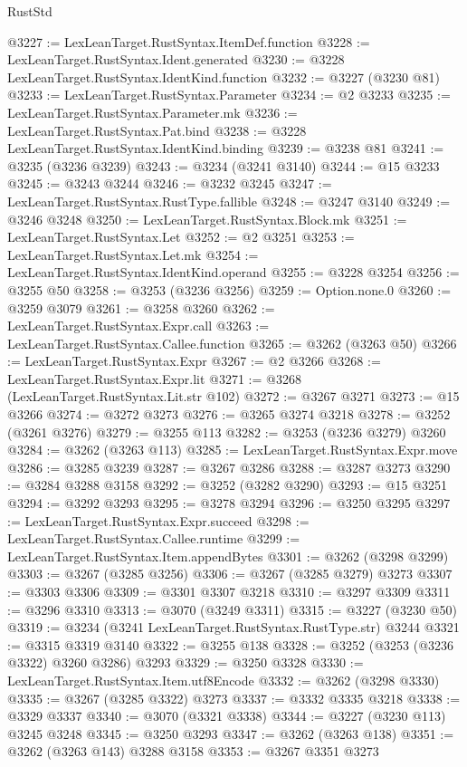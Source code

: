 \begin{lexlean}{RustStd}
\begin{coremodule}
@3227 := LexLeanTarget.RustSyntax.ItemDef.function
@3228 := LexLeanTarget.RustSyntax.Ident.generated
@3230 := @3228 LexLeanTarget.RustSyntax.IdentKind.function
@3232 := @3227 (@3230 @81)
@3233 := LexLeanTarget.RustSyntax.Parameter
@3234 := @2 @3233
@3235 := LexLeanTarget.RustSyntax.Parameter.mk
@3236 := LexLeanTarget.RustSyntax.Pat.bind
@3238 := @3228 LexLeanTarget.RustSyntax.IdentKind.binding
@3239 := @3238 @81
@3241 := @3235 (@3236 @3239)
@3243 := @3234 (@3241 @3140)
@3244 := @15 @3233
@3245 := @3243 @3244
@3246 := @3232 @3245
@3247 := LexLeanTarget.RustSyntax.RustType.fallible
@3248 := @3247 @3140
@3249 := @3246 @3248
@3250 := LexLeanTarget.RustSyntax.Block.mk
@3251 := LexLeanTarget.RustSyntax.Let
@3252 := @2 @3251
@3253 := LexLeanTarget.RustSyntax.Let.mk
@3254 := LexLeanTarget.RustSyntax.IdentKind.operand
@3255 := @3228 @3254
@3256 := @3255 @50
@3258 := @3253 (@3236 @3256)
@3259 := Option.none.{0}
@3260 := @3259 @3079
@3261 := @3258 @3260
@3262 := LexLeanTarget.RustSyntax.Expr.call
@3263 := LexLeanTarget.RustSyntax.Callee.function
@3265 := @3262 (@3263 @50)
@3266 := LexLeanTarget.RustSyntax.Expr
@3267 := @2 @3266
@3268 := LexLeanTarget.RustSyntax.Expr.lit
@3271 := @3268 (LexLeanTarget.RustSyntax.Lit.str @102)
@3272 := @3267 @3271
@3273 := @15 @3266
@3274 := @3272 @3273
@3276 := @3265 @3274 @3218
@3278 := @3252 (@3261 @3276)
@3279 := @3255 @113
@3282 := @3253 (@3236 @3279) @3260
@3284 := @3262 (@3263 @113)
@3285 := LexLeanTarget.RustSyntax.Expr.move
@3286 := @3285 @3239
@3287 := @3267 @3286
@3288 := @3287 @3273
@3290 := @3284 @3288 @3158
@3292 := @3252 (@3282 @3290)
@3293 := @15 @3251
@3294 := @3292 @3293
@3295 := @3278 @3294
@3296 := @3250 @3295
@3297 := LexLeanTarget.RustSyntax.Expr.succeed
@3298 := LexLeanTarget.RustSyntax.Callee.runtime
@3299 := LexLeanTarget.RustSyntax.Item.appendBytes
@3301 := @3262 (@3298 @3299)
@3303 := @3267 (@3285 @3256)
@3306 := @3267 (@3285 @3279) @3273
@3307 := @3303 @3306
@3309 := @3301 @3307 @3218
@3310 := @3297 @3309
@3311 := @3296 @3310
@3313 := @3070 (@3249 @3311)
@3315 := @3227 (@3230 @50)
@3319 := @3234 (@3241 LexLeanTarget.RustSyntax.RustType.str) @3244
@3321 := @3315 @3319 @3140
@3322 := @3255 @138
@3328 := @3252 (@3253 (@3236 @3322) @3260 @3286) @3293
@3329 := @3250 @3328
@3330 := LexLeanTarget.RustSyntax.Item.utf8Encode
@3332 := @3262 (@3298 @3330)
@3335 := @3267 (@3285 @3322) @3273
@3337 := @3332 @3335 @3218
@3338 := @3329 @3337
@3340 := @3070 (@3321 @3338)
@3344 := @3227 (@3230 @113) @3245 @3248
@3345 := @3250 @3293
@3347 := @3262 (@3263 @138)
@3351 := @3262 (@3263 @143) @3288 @3158
@3353 := @3267 @3351 @3273

\end{coremodule}
\end{lexlean}
